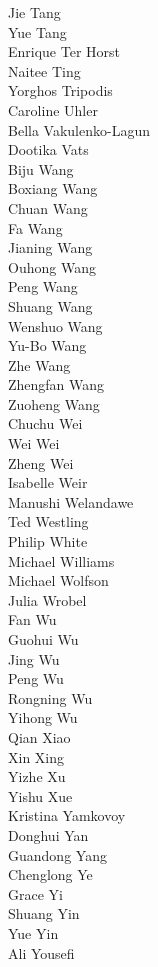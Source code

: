 Jie Tang\\
Yue Tang\\
Enrique Ter Horst\\
Naitee Ting\\
Yorghos Tripodis\\
Caroline Uhler\\
Bella Vakulenko-Lagun\\
Dootika Vats\\
Biju Wang\\
Boxiang Wang\\
Chuan Wang\\
Fa Wang\\
Jianing Wang\\
Ouhong Wang\\
Peng Wang\\
Shuang Wang\\
Wenshuo Wang\\
Yu-Bo Wang\\
Zhe Wang\\
Zhengfan Wang\\
Zuoheng Wang\\
Chuchu Wei\\
Wei Wei\\
Zheng Wei\\
Isabelle Weir\\
Manushi Welandawe\\
Ted Westling\\
Philip White\\
Michael Williams\\
Michael Wolfson\\
Julia Wrobel\\
Fan Wu\\
Guohui Wu\\
Jing Wu\\
Peng Wu\\
Rongning Wu\\
Yihong Wu\\
Qian Xiao\\
Xin Xing\\
Yizhe Xu\\
Yishu Xue\\
Kristina Yamkovoy\\
Donghui Yan\\
Guandong Yang\\
Chenglong Ye\\
Grace Yi\\
Shuang Yin\\
Yue Yin\\
Ali Yousefi\\
